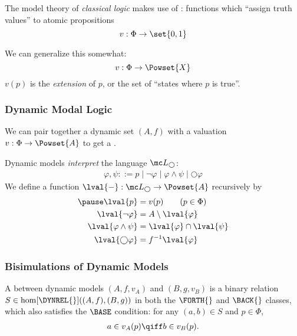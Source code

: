 {\begin{frame}
        The model theory of \textit{classical logic} makes use of : functions which ``assign truth values'' to atomic propositions
            \[ v : \Phi \to \set{0,1} \]\pause
        
        \vspace{-0.5cm}

        We can generalize this somewhat:
            \[ v : \Phi \to \Powset{X} \]\pause
        $v(p)$ is the \textit{extension} of $p$, or the set of ``states where $p$ is true''.
    \end{frame}

    \begin{frame}
        \frametitle{Dynamic Modal Logic}
        We can pair together a dynamic set $(A,f)$ with a valuation $v:\Phi\to\Powset{A}$ to get a .\pause

        Dynamic models \textit{interpret} the language $\mc L_{\bigcirc}$:
        \begin{align*}
            \varphi,\psi ::= p \mid \neg\varphi \mid \varphi\land\psi \mid \bigcirc\varphi \tag{$p\in\Phi$}
        \end{align*}\pause
        We define a function $\lval{-}:\mc L_{\bigcirc}\to\Powset{A}$ recursively by
        \begin{align*}\pause
        \lval{p} &= v(p) \tag{$p\in\Phi$}\\
        \lval{\neg\varphi} &= A\setminus \lval{\varphi} \\
        \lval{\varphi\land\psi} &= \lval{\varphi}\cap\lval{\psi}\\
        \lval{\bigcirc\varphi} &= f^{-1}\lval{\varphi}
        \end{align*}
    \end{frame}

    \begin{frame}
        \frametitle{Bisimulations of Dynamic Models}
         A  between dynamic models $(A,f,v_A)$ and $(B,g,v_B)$ is a binary relation $S\in\hom[\DYNREL{}]((A,f),(B,g))$ in both the $\FORTH{}$ and $\BACK{}$ classes, which also satisfies the $\BASE$ condition: for any $(a,b)\in S$ and $p\in\Phi$,
            \begin{align*}
                a\in v_A(p) \qiff b\in v_B(p).
            \end{align*}
    \end{frame}

}
